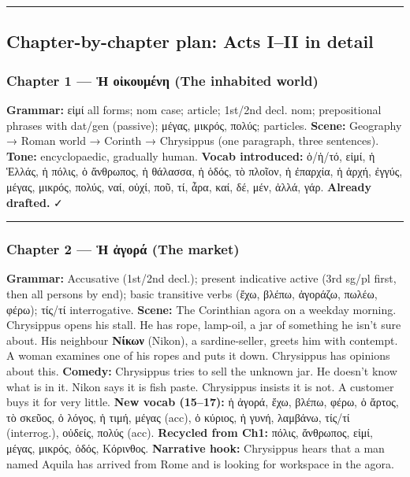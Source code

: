 \documentclass[a4paper]{report}
\begin{document}
\begin{center}\rule{0.5\linewidth}{0.5pt}\end{center}

\subsection{Chapter-by-chapter plan: Acts I--II in
detail}\label{chapter-by-chapter-plan-acts-iii-in-detail}

\subsubsection{Chapter 1 --- Ἡ οἰκουμένη (The inhabited
world)}\label{chapter-1-ux1f21-ux3bfux1f30ux3baux3bfux3c5ux3bcux3adux3bdux3b7-the-inhabited-world}

\textbf{Grammar:} εἰμί all forms; nom case; article; 1st/2nd decl. nom;
prepositional phrases with dat/gen (passive); μέγας, μικρός, πολύς;
particles. \textbf{Scene:} Geography → Roman world → Corinth →
Chrysippus (one paragraph, three sentences). \textbf{Tone:}
encyclopaedic, gradually human. \textbf{Vocab introduced:} ὁ/ἡ/τό, εἰμί,
ἡ Ἑλλάς, ἡ πόλις, ὁ ἄνθρωπος, ἡ θάλασσα, ἡ ὁδός, τὸ πλοῖον, ἡ ἐπαρχία, ἡ
ἀρχή, ἐγγύς, μέγας, μικρός, πολύς, ναί, οὐχί, ποῦ, τί, ἆρα, καί, δέ,
μέν, ἀλλά, γάρ. \textbf{Already drafted.} ✓

\begin{center}\rule{0.5\linewidth}{0.5pt}\end{center}

\subsubsection{Chapter 2 --- Ἡ ἀγορά (The
market)}\label{chapter-2-ux1f21-ux1f00ux3b3ux3bfux3c1ux3ac-the-market}

\textbf{Grammar:} Accusative (1st/2nd decl.); present indicative active
(3rd sg/pl first, then all persons by end); basic transitive verbs (ἔχω,
βλέπω, ἀγοράζω, πωλέω, φέρω); τίς/τί interrogative. \textbf{Scene:} The
Corinthian agora on a weekday morning. Chrysippus opens his stall. He
has rope, lamp-oil, a jar of something he isn't sure about. His
neighbour \textbf{Νίκων} (Nikon), a sardine-seller, greets him with
contempt. A woman examines one of his ropes and puts it down. Chrysippus
has opinions about this. \textbf{Comedy:} Chrysippus tries to sell the
unknown jar. He doesn't know what is in it. Nikon says it is fish paste.
Chrysippus insists it is not. A customer buys it for very little.
\textbf{New vocab (15--17):} ἡ ἀγορά, ἔχω, βλέπω, φέρω, ὁ ἄρτος, τὸ
σκεῦος, ὁ λόγος, ἡ τιμή, μέγας (acc), ὁ κύριος, ἡ γυνή, λαμβάνω, τίς/τί
(interrog.), οὐδείς, πολύς (acc). \textbf{Recycled from Ch1:} πόλις,
ἄνθρωπος, εἰμί, μέγας, μικρός, ὁδός, Κόρινθος. \textbf{Narrative hook:}
Chrysippus hears that a man named Aquila has arrived from Rome and is
looking for workspace in the agora.
\end{document}
